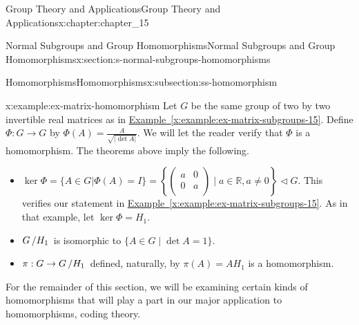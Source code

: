 \documentclass[oneside,10pt,]{book}
\newcommand{\xreffont}{\relax}
\numberwithin{equation}{section}
\begin{document}
\begin{chapterptx}{Group Theory and Applications}{}{Group Theory and Applications}{}{}{x:chapter:chapter_15}
\begin{sectionptx}{Normal Subgroups and Group Homomorphisms}{}{Normal Subgroups and Group Homomorphisms}{}{}{x:section:s-normal-subgroups-homomorphisms}
\begin{subsectionptx}{Homomorphisms}{}{Homomorphisms}{}{}{x:subsection:ss-homomorphism}
\begin{example}{}{x:example:ex-matrix-homomorphism}
Let \(G\) be the same group of two by two invertible real matrices as in \hyperref[x:example:ex-matrix-subgroups-15]{Example~{\xreffont\ref{x:example:ex-matrix-subgroups-15}}}.  Define \(\Phi: G \rightarrow G\) by \(\Phi(A) = \frac{A}{\sqrt{\lvert \det  A \rvert }}\). We will let the reader verify that \(\Phi\) is a homomorphism. The theorems above imply the following.%
\begin{itemize}[label=\textbullet]
\item{}\(\ker  \Phi  = \{A\in G |\Phi (A) =I\} = \left\{\left(
\begin{array}{cc}
a & 0 \\
0 & a \\
\end{array}
\right) \mid a\in \mathbb{R},a\neq 0\right\}\triangleleft G\).  This verifies our statement in \hyperref[x:example:ex-matrix-subgroups-15]{Example~{\xreffont\ref{x:example:ex-matrix-subgroups-15}}}. As in that example, let \(\ker
\Phi  = H_1\).%
\item{}\(G\left/H_1\right.\) is isomorphic to \(\{A \in G \mid \det A= 1\}\).%
\item{}\(\pi: G \rightarrow G\left/H_1\right.\) defined, naturally, by \(\pi(A) =A H_1\) is a homomorphism.%
\end{itemize}
%
\end{example}
For the remainder of this section, we will be examining certain kinds of homomorphisms that will play a part in our major application to homomorphisms, coding theory.%
\end{subsectionptx}
\end{sectionptx}
\end{chapterptx}
\end{document}
